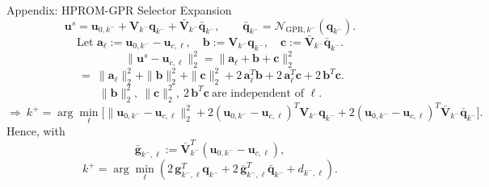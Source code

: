 \documentclass{beamer}
\begin{document}
\begin{frame}{Appendix: HPROM-GPR Selector Expansion}
\scriptsize
\[
\mathbf u^s=
\mathbf u_{0,k^-}
+\mathbf V_{k^-}\mathbf q_{k^-}
+\bar{\mathbf V}_{k^-}\bar{\mathbf q}_{k^-},
\qquad
\bar{\mathbf q}_{k^-}=\mathcal N_{\mathrm{GPR},k^-}(\mathbf q_{k^-}).
\]
\[
\text{Let }\mathbf a_\ell:=\mathbf u_{0,k^-}-\mathbf u_{c,\ell},\quad
\mathbf b:=\mathbf V_{k^-}\mathbf q_{k^-},\quad
\mathbf c:=\bar{\mathbf V}_{k^-}\bar{\mathbf q}_{k^-}.
\]
\[
\|\mathbf u^s-\mathbf u_{c,\ell}\|_2^2
=\|\mathbf a_\ell+\mathbf b+\mathbf c\|_2^2
\]
\[
\ =\ \|\mathbf a_\ell\|_2^2+\|\mathbf b\|_2^2+\|\mathbf c\|_2^2
+2\,\mathbf a_\ell^T\mathbf b
+2\,\mathbf a_\ell^T\mathbf c
+2\,\mathbf b^T\mathbf c.
\]
\[
\|\mathbf b\|_2^2,\ \|\mathbf c\|_2^2,\ 2\,\mathbf b^T\mathbf c
\ \text{are independent of }\ell.
\]
\[
\Rightarrow\ 
k^+=\arg\min_{\ell}
\Big[
\|\mathbf u_{0,k^-}-\mathbf u_{c,\ell}\|_2^2
+2(\mathbf u_{0,k^-}-\mathbf u_{c,\ell})^T\mathbf V_{k^-}\mathbf q_{k^-}
+2(\mathbf u_{0,k^-}-\mathbf u_{c,\ell})^T\bar{\mathbf V}_{k^-}\bar{\mathbf q}_{k^-}
\Big].
\]
Hence, with
\[
\bar{\mathbf g}_{k^-,\ell}:=\bar{\mathbf V}_{k^-}^T(\mathbf u_{0,k^-}-\mathbf u_{c,\ell}),
\]
\[
k^+=\arg\min_{\ell}
\left(
2\,\mathbf g_{k^-,\ell}^T\mathbf q_{k^-}
+2\,\bar{\mathbf g}_{k^-,\ell}^T\bar{\mathbf q}_{k^-}
+d_{k^-,\ell}
\right).
\]
\end{frame}
\end{document}
